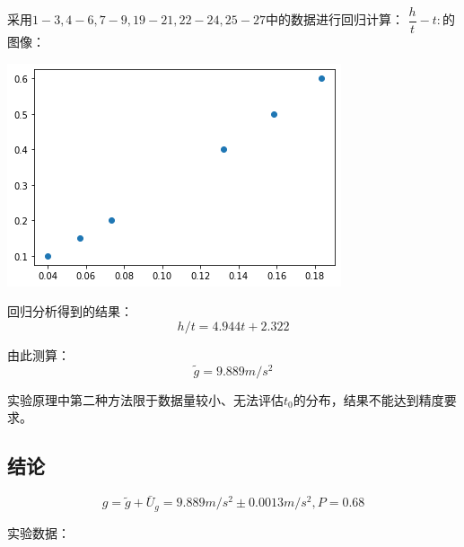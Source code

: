 \documentclass[a4paper]{ltxdoc}
\newenvironment{Figure}
  {\par\medskip\noindent\minipage{\linewidth}}
  {\endminipage\par\medskip}
\begin{document}
\begin{multicols}{2}
    \smallskip
    采用$1-3,4-6,7-9,19-21,22-24,25-27$中的数据进行回归计算：
    $\dfrac h t -t:$的图像：
    \begin{Figure}
        \centering
        \includegraphics[width=\linewidth]{output.png}
    \end{Figure}
    回归分析得到的结果：
    $$h/t = 4.944 t + 2.322$$

    由此测算：
    $$\widetilde g=9.889 m/s^2$$

    实验原理中第二种方法限于数据量较小、无法评估$t_0$的分布，结果不能达到精度要求。
    \subsection{结论}
    $$g=\widetilde g + \bar U_g =9.889 m/s^2\pm 0.0013 m/s^2, P=0.68$$
    
    实验数据：


\end{multicols}
\end{document}
